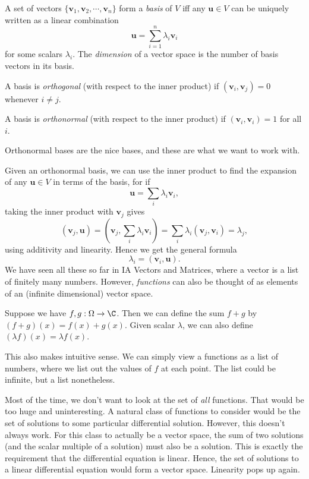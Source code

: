 \documentclass[a4paper]{article}
\begin{document}
\begin{defi}[Basis]
  A set of vectors $\{\mathbf{v}_1, \mathbf{v}_2, \cdots, \mathbf{v}_n\}$ form a \emph{basis} of $V$ iff any $\mathbf{u}\in V$ can be uniquely written as a linear combination
  \[
    \mathbf{u} = \sum_{i = 1}^n \lambda_i \mathbf{v}_i
  \]
  for some scalars $\lambda_i$. The \emph{dimension} of a vector space is the number of basis vectors in its basis.

  A basis is \emph{orthogonal} (with respect to the inner product) if $(\mathbf{v}_i, \mathbf{v}_j) = 0$ whenever $i\not = j$.

  A basis is \emph{orthonormal} (with respect to the inner product) if $(\mathbf{v}_i, \mathbf{v}_i) = 1$ for all $i$.
\end{defi}
Orthonormal bases are the nice bases, and these are what we want to work with.

Given an orthonormal basis, we can use the inner product to find the expansion of any $\mathbf{u}\in V$ in terms of the basis, for if
\[
  \mathbf{u} = \sum_i \lambda_i \mathbf{v}_i,
\]
taking the inner product with $\mathbf{v}_j$ gives
\[
  (\mathbf{v}_j, \mathbf{u}) = \left(\mathbf{v}_j, \sum_i \lambda_i \mathbf{v}_i\right) = \sum_i \lambda_i (\mathbf{v}_j, \mathbf{v}_i) = \lambda_j,
\]
using additivity and linearity. Hence we get the general formula
\[
  \lambda_i = (\mathbf{v}_i, \mathbf{u}).
\]
We have seen all these so far in IA Vectors and Matrices, where a vector is a list of finitely many numbers. However, \emph{functions} can also be thought of as elements of an (infinite dimensional) vector space.

Suppose we have $f, g: \Omega \to \C$. Then we can define the sum $f + g$ by $(f + g)(x) = f(x) + g(x)$. Given scalar $\lambda$, we can also define $(\lambda f)(x) = \lambda f(x)$.

This also makes intuitive sense. We can simply view a functions as a list of numbers, where we list out the values of $f$ at each point. The list could be infinite, but a list nonetheless.

Most of the time, we don't want to look at the set of \emph{all} functions. That would be too huge and uninteresting. A natural class of functions to consider would be the set of solutions to some particular differential solution. However, this doesn't always work. For this class to actually be a vector space, the sum of two solutions (and the scalar multiple of a solution) must also be a solution. This is exactly the requirement that the differential equation is linear. Hence, the set of solutions to a linear differential equation would form a vector space. Linearity pops up again.
\end{document}
